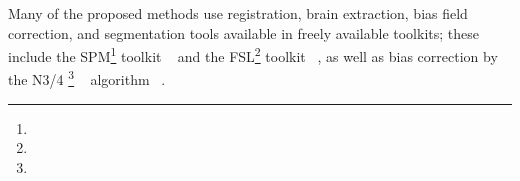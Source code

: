 Many of the proposed methods use registration, brain extraction, bias field correction, and segmentation tools available in freely available toolkits; these include the SPM\footnote{} toolkit
~\cite{Sajja2006,Dyrby2008,Akselrod-Ballin2009,Smart2011,Schmidt2012,Yoo2014,Ithapu2014,Roy2015,Valverde2016} and the
FSL\footnote{} toolkit
~\cite{Herskovits2008,Gibson2010,Datta2013,Steenwijk2013,Sweeney2013,Roy2015,Wang2015,Griffanti2016,Zhan2017},
as well as bias correction by the
N3/4
\footnote{} 
~\cite{Tustison2010}
algorithm
~\cite{Zijdenbos2002,Harmouche2006,Fartaria2015,Guizard2015,Harmouche2015,Mechrez2016,Valverde2016,Dadar2017,Zhan2017}.
